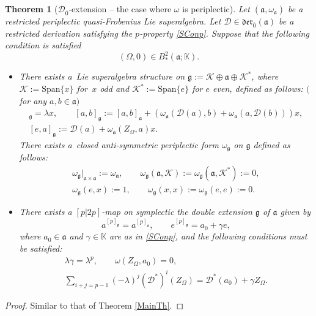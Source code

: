 \documentclass[10pt,a4paper]{amsart}
\numberwithin{equation}{section}
\newtheorem{Theorem}{Theorem}[section]
\begin{document}
\begin{Theorem}[${\mathscr D}_{\bar 0}$-extension -- the case where $\omega$ is periplectic]\label{MainThOE} Let $(\mathfrak{a}, \omega_\mathfrak{a})$ be a restricted periplectic quasi-Frobenius Lie superalgebra. Let ${\mathscr D}\in \mathfrak{der}_{\bar 0}(\mathfrak{a})$ be a restricted derivation satisfying the $p$-property \eqref{SConp}. Suppose that the following condition is satisfied
\[
(\Omega, 0) \in B^2_*(\mathfrak{a}; \mathbb{K}).
\]
\begin{itemize}\itemsep=0pt
\item[$(i)$] There exists a~Lie superalgebra structure on $\mathfrak{g}:=\mathscr{K} \oplus \mathfrak{a} \oplus \mathscr{K} ^*$, where $\mathscr{K} :=\mathrm{Span}\{x\}$ for~$x$ odd and $\mathscr{K}^* :=\mathrm{Span}\{e\}$ for $e$ even, defined as follows: $($for any $a, b\in \mathfrak{a})$
\begin{gather*}
[x ,e]_\mathfrak{g}=\lambda x, \qquad [a,b]_\mathfrak{g} := [a,b]_\mathfrak{a} + (\omega_\mathfrak{a}( {\mathscr D}(a), b) + \omega_\mathfrak{a}(a, {\mathscr D}(b)))x, \\
 [e,a]_\mathfrak{g} := {\mathscr D}(a)+ \omega_\mathfrak{a}(Z_\Omega,a)x.
\end{gather*}
There exists a~closed anti-symmetric periplectic form $\omega_\mathfrak{g}$ on $\mathfrak{g}$ defined as follows:
\begin{gather*}
{\omega_\mathfrak{g}}\vert_{\mathfrak{a} \times \mathfrak{a}}:= \omega_\mathfrak{a}, \qquad \omega_\mathfrak{g}(\mathfrak{a},\mathscr{K} ):=\omega_\mathfrak{g}(\mathfrak{a},\mathscr{K} ^*):=0, \\ \omega_\mathfrak{g}(e,x):=1, \qquad
\omega_\mathfrak{g}(x,x):=\omega_\mathfrak{g}(e,e) :=0.
\end{gather*}
\item[$(ii)$] There exists a $[p|2p]$-map on symplectic the double extension $\mathfrak{g}$ of $\mathfrak{a}$ given by
\[
a^{[p]_\mathfrak{g}} = a^{[p]_\mathfrak{a}}, \qquad
e^{[p]_\mathfrak{g}} = a_0+\gamma e,
\]
where $a_0\in \mathfrak{a}$ and $\gamma \in \mathbb{K}$ are as in \eqref{SConp}, and the following conditions must be satisfied:
\begin{gather*}
\lambda \gamma = \lambda^p,\qquad \omega(Z_\Omega, a_0) = 0,\\
 \sum_{i+j=p-1}(-\lambda)^j({\mathscr D}^*)^{i} (Z_\Omega) = {\mathscr D}^*(a_0) + \gamma Z_\Omega.
\end{gather*}
\end{itemize}
\end{Theorem}
\begin{proof}
Similar to that of Theorem \ref{MainTh}.
\end{proof}
\end{document}
